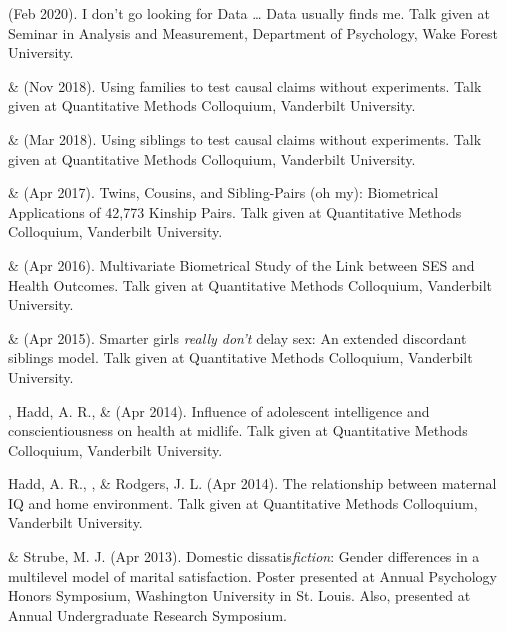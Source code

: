 
\item\meb (Feb 2020). I don't go looking for Data … Data usually finds me. Talk given at Seminar in Analysis and Measurement, Department of Psychology, Wake Forest University. 
%
\item\meb \& \Joe (Nov 2018). Using families to test causal claims without experiments. Talk given at Quantitative Methods Colloquium, Vanderbilt University. 

\item\meb \& \Joe (Mar 2018). Using siblings to test causal claims without experiments. Talk given at Quantitative Methods Colloquium, Vanderbilt University.
%
\item\meb \& \Joe (Apr 2017). Twins, Cousins, and Sibling-Pairs (oh my): Biometrical Applications of 42,773 Kinship Pairs. Talk given at Quantitative Methods Colloquium, Vanderbilt University. %
%
\item\meb \& \Joe (Apr 2016). Multivariate Biometrical Study of the Link between SES and Health Outcomes. Talk given at Quantitative Methods Colloquium, Vanderbilt University.
%
\item\meb \& \Joe (Apr 2015). Smarter girls \textit{really don't} delay sex: An extended discordant siblings model. Talk given at Quantitative Methods Colloquium, Vanderbilt University.
\item\meb, Hadd, A. R., \& \Joe (Apr 2014). Influence of adolescent intelligence and conscientiousness on health at midlife. Talk given at Quantitative Methods Colloquium, Vanderbilt University. 
%
\item Hadd, A. R., \meb, \& Rodgers, J. L. (Apr 2014). The relationship between maternal IQ and home environment. Talk given at Quantitative Methods Colloquium, Vanderbilt University.
%
\item\meb \& Strube, M. J. (Apr 2013). Domestic dissatis{\em fiction}: Gender differences in a multilevel model of marital satisfaction. Poster presented at Annual Psychology Honors Symposium, Washington University in St. Louis. Also, presented at Annual Undergraduate Research Symposium.
\smallskip\\

